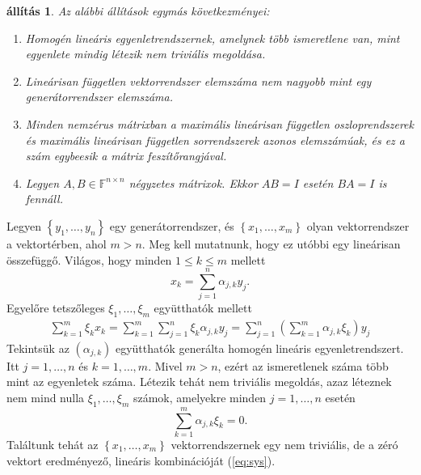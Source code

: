 \documentclass[9pt, a4paper, showtrims]{memoir}
\makeatletter
\renewenvironment{proof}[1][\proofname]
    {\par\pushQED{\qed}%
    \normalfont \topsep6\p@\@plus6\p@\relax
    \trivlist
    \item[\hskip\labelsep
        \itshape
    #1\@addpunct{:}]\ignorespaces}
    {\popQED\endtrivlist\@endpefalse}
\theoremstyle{plain}
\newtheorem{proposition}{állítás}[chapter]
\theoremstyle{remark}
\theoremstyle{definition}
\makeatother
\begin{document}
\begin{proposition}
    Az alábbi állítások egymás következményei:
    \begin{enumerate}
        \item Homogén lineáris egyenletrendszernek, amelynek több ismeretlene van, mint egyenlete
            mindig létezik nem triviális megoldása.
        \item Lineárisan független vektorrendszer elemszáma nem nagyobb mint egy generátorrendszer elemszáma.
        \item Minden nemzérus mátrixban 
            a maximális lineárisan független oszloprendszerek 
            és maximális lineárisan független sorrendszerek azonos elemszámúak, 
            és ez a szám egybeesik a mátrix feszítőrangjával.
        \item
            Legyen $A,B\in\mathbb{F}^{n\times n}$ négyzetes mátrixok.
            Ekkor $AB=I$ esetén $BA=I$ is fennáll.\qedhere
    \end{enumerate}
\end{proposition}
\begin{proof}[1. \Rightarrow 2.]
    Legyen $\left\{ y_1,\dots,y_n \right\}$ egy generátorrendszer,
    és $\left\{ x_1,\dots,x_m \right\}$ olyan vektorrendszer a vektortérben, ahol $m>n$.
    Meg kell mutatnunk, hogy ez utóbbi egy lineárisan összefüggő.
    Világos, hogy minden $1\leq k\leq m$ mellett
    \[
        x_k=\sum_{j=1}^n\alpha_{j,k}y_j.
    \]
    Egyelőre tetszőleges $\xi_1,\dots,\xi_m$ együtthatók mellett
    \begin{eqnarray}
        \sum_{k=1}^m\xi_kx_k=
        \sum_{k=1}^m\sum_{j=1}^n\xi_k\alpha_{j,k}y_j=
        \sum_{j=1}^n\left( \sum_{k=1}^m\alpha_{j,k}\xi_k \right)y_j
        \label{eq:sys}
    \end{eqnarray}
    Tekintsük az $\left( \alpha_{j,k} \right)$ együtthatók generálta
    homogén lineáris egyenletrendszert. 
    Itt $j=1,\dots,n$ és $k=1,\dots,m$.
    Mivel $m>n$, ezért az ismeretlenek száma több mint az egyenletek száma.
    Létezik tehát nem triviális megoldás, azaz léteznek nem mind nulla
    $\xi_1,\dots,\xi_m$ számok, amelyekre minden $j=1,\dots,n$ esetén
    \[
        \sum_{k=1}^m\alpha_{j,k}\xi_k=0.
    \]
    Találtunk tehát az $\left\{ x_1,\dots,x_m \right\}$ vektorrendszernek egy
    nem triviális, 
    de a zéró vektort eredményező,
    lineáris kombinációját (\ref{eq:sys}).
\end{proof}
\end{document}
